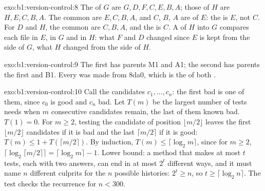 \begin{solution}{exo:b1:version-control:8}
The  of $G$ are $G, D, F, C, E, B, A$; those of $H$ are $H, E, C, B, A$. The common  are $E, C, B, A$, and
$C$, $B$, $A$ are  of $E$: the  is $E$, not $C$. For $D$ and $H$, the common  are $C, B, A$,
and the  is $C$. A  of $H$ into $G$ compares each file in $E$, in $G$ and in $H$: what $F$ and $D$ changed
since $E$ is kept from the side of $G$, what $H$ changed from the side of $H$.
\end{solution}

\begin{solution}{exo:b1:version-control:9}
The first   has parents M1 and A1; the second has parents the first  and B1. Every  was made from
8da0, which is the  of both .
\end{solution}

\begin{solution}{exo:b1:version-control:10}
Call the candidates $c_1, \dots, c_n$: the first bad  is one of them, since $c_0$ is good and $c_n$ bad. Let
$T(m)$ be the largest number of tests  needs when $m$ consecutive candidates remain, the last of them known bad.
$T(1) = 0$. For $m \geq 2$, testing the candidate of position $\lfloor m / 2 \rfloor$ leaves the first $\lfloor m / 2
\rfloor$ candidates if it is bad and the last $\lceil m / 2 \rceil$ if it is good: $T(m) \leq 1 + T(\lceil m / 2
\rceil)$. By induction, $T(m) \leq \lceil \log_2 m \rceil$, since for $m \geq 2$, $\lceil \log_2 \lceil m / 2 \rceil
\rceil = \lceil \log_2 m \rceil - 1$. Lower bound: a method that makes at most $t$ tests, each with two answers, can end
in at most $2^t$ different ways, and it must name $n$ different culprits for the $n$ possible histories: $2^t \geq n$,
so $t \geq \lceil \log_2 n \rceil$. The test  checks the recurrence for $n < 300$.
\end{solution}

